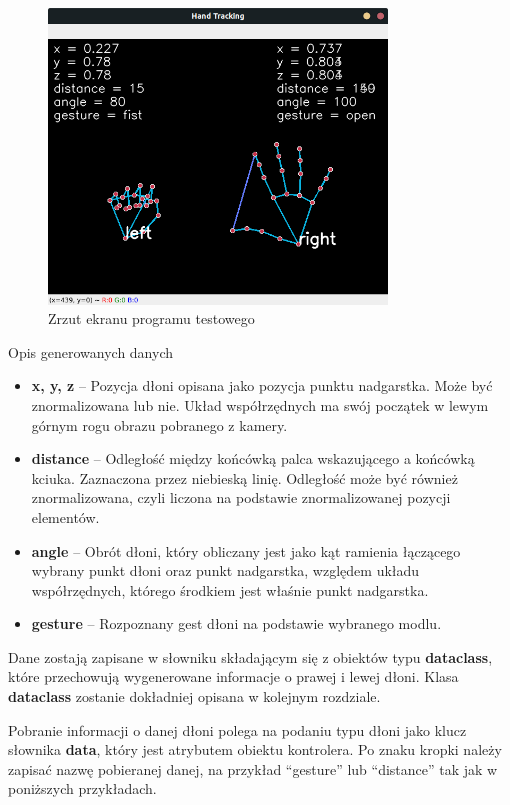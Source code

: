 \begin{figure}[H]
    \begin{center}
        \includegraphics[width=9cm]{../images/example_program.png}
        \caption{Zrzut ekranu programu testowego}
        \label{fig:prog_screen_1}
    \end{center}
\end{figure}


Opis generowanych danych

\begin{itemize}
    \item \textbf{x, y, z} -- Pozycja dłoni opisana jako pozycja punktu nadgarstka. Może być znormalizowana lub nie. Układ współrzędnych ma swój początek w lewym górnym rogu obrazu pobranego z kamery. 
    \item \textbf{distance} -- Odległość między końcówką palca wskazującego a końcówką kciuka. Zaznaczona przez niebieską linię. Odległość może być również znormalizowana, czyli liczona na podstawie znormalizowanej pozycji elementów. 
    \item \textbf{angle} -- Obrót dłoni, który obliczany jest jako kąt ramienia łączącego wybrany punkt dłoni oraz punkt nadgarstka, względem układu współrzędnych, którego środkiem jest właśnie punkt nadgarstka.
    \item \textbf{gesture} -- Rozpoznany gest dłoni na podstawie wybranego modlu.\newline
\end{itemize}

\quad Dane zostają zapisane w słowniku składającym się z obiektów typu \textbf{dataclass}, które przechowują wygenerowane informacje o prawej i lewej dłoni. Klasa \textbf{dataclass} zostanie dokładniej opisana w kolejnym rozdziale.

\newpage
\quad Pobranie informacji o danej dłoni polega na podaniu typu dłoni jako klucz słownika \textbf{data}, który jest atrybutem obiektu kontrolera. Po znaku kropki należy zapisać nazwę pobieranej danej, na przykład \enquote{gesture} lub \enquote{distance} tak jak w poniższych przykładach.\newline

